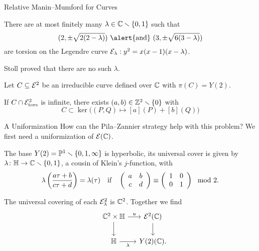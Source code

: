 \documentclass{beamer}
\begin{document}
\begin{frame}{Relative Manin--Mumford for Curves}
  
  \begin{theorem}
    There are at most finitely many $\lambda\in{\mathbb{C}}\smallsetminus\{0,1\}$ such
    that
    \begin{equation*}
      (2,\pm \sqrt{2(2-\lambda)}) \text{ \alert{and} } (3,\pm \sqrt{6(3-\lambda)})
    \end{equation*}
    are torsion on the Legendre curve ${\mathcal E}_\lambda : y^2 =
    x(x-1)(x-\lambda)$. 
  \end{theorem}

  Stoll proved that there are \alert{no} such $\lambda$.

  \begin{theorem}
    Let $C\subseteq{\mathcal E}^2$ be an irreducible curve  defined over ${\mathbb{C}}$ with
    $\pi(C)=Y(2)$.
    
    If $C\cap {\mathcal E}^2_{\mathrm{tors}}$ is
    \alert{infinite},  there exists $(a,b)\in{\mathbb{Z}}^2\smallsetminus\{0\}$ with
    \begin{equation*}
      C \subset \ker{\bigl((P,Q)\mapsto [a](P)+[b](Q)\bigr)} 
    \end{equation*}    
  \end{theorem} 
\end{frame}

\begin{frame}{A Uniformization}
  How can the Pila--Zannier strategy help with this problem?
  We  first need a uniformization of ${\mathcal E}({\mathbb{C}})$.

  The base $Y(2) ={\mathbb{P}}^{1}\smallsetminus\{0,1,\infty\}$ is hyperbolic, its
  universal cover is given by  $\lambda\colon {\mathbb{H}}\rightarrow
  {\mathbb{C}}\smallsetminus\{0,1\}$, a cousin of Klein's $j$-function, with
  \begin{equation*}
        \lambda\left(\frac{a\tau+b}{c\tau +d}\right) =
        \lambda(\tau)\quad\text{if}\quad
    \left( \begin{array}{cc} {a} & {b} \\ {c} & {d} \end{array} \right)   \equiv \left( \begin{array}{cc} {1} & {0} \\ {0} & {1} \end{array} \right) \mod 2.
  \end{equation*}
  
  The universal covering of each ${\mathcal E}^2_\lambda$ is ${\mathbb{C}}^2$.   Together we find
  \begin{equation*}
    \begin{tikzcd}[ampersand replacement=\&,column sep=small, row sep=small] 
      \& \IC^2\times\IH  \arrow{dd}{} \arrow{r}{u} \& \cE^2(\IC)\arrow{dd}{}\\
      \&  \&\\
      \&    \IH \arrow[swap]{r}{\lambda}  \& Y(2)(\IC).
    \end{tikzcd}
  \end{equation*}

\end{frame}
\end{document}
